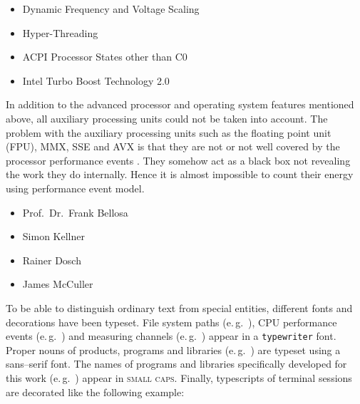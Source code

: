 \begin{itemize}

\item Dynamic Frequency and Voltage Scaling \cite{wiki:DVFS}

\item Hyper-Threading \cite{wiki:HT}

\item ACPI Processor States other than C0 \cite{wiki:ACPI}

\item Intel\TReg{} Turbo Boost Technology 2.0 \cite{wiki:IntelTurboBoost}

\end{itemize}

In addition to the advanced processor and operating system features mentioned
above, all auxiliary processing units could not be taken into account. The
problem with the auxiliary processing units such as the floating point unit
(FPU), MMX\cite{wiki:MMX}, SSE\cite{wiki:SSE} and AVX\cite{wiki:AVX} is that
they are not or not well covered by the processor performance events
\cite{intel2011events}. They somehow act as a black box not revealing the
work they do internally. Hence it is almost impossible to count their energy
using performance event model.


\begin{itemize}

\item Prof.\ Dr.\ Frank Bellosa

\item Simon Kellner

\item Rainer Dosch

\item James McCuller

\end{itemize}


\label{sec:preliminaries}

To be able to distinguish ordinary text from special entities, different fonts
and decorations have been typeset. File system paths (e.\,g.\ ),
CPU performance events (e.\,g.\ \JWctrCLK{}) and measuring channels (e.\,g.\ 
) appear in a \texttt{typewriter} font. Proper nouns of
products, programs and libraries (e.\,g.\ \JWTleaps{}) are typeset using a
\textsf{sans--serif} font. The names of programs and libraries specifically
developed for this work (e.\,g.\ \JWTdd{}) appear in \textsc{small caps}.
Finally, typescripts of terminal sessions are decorated like the following
example:

